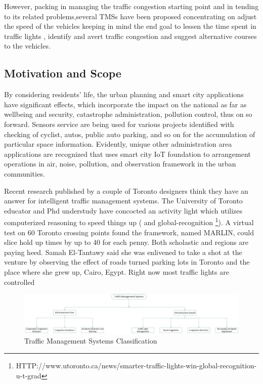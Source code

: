 \documentclass[conference]{IEEEtran}
\begin{document}
  However, packing in managing the traffic congestion starting point and in tending to its related problems,several TMSs have been proposed concentrating on adjust the speed of the vehicles keeping in mind the end goal to lessen the time spent in traffic lights , identify and avert traffic congestion and suggest alternative courses to the vehicles.
 \subsection{Motivation and Scope}
  By considering residents' life, the urban planning and smart city applications have significant effects, which incorporate the impact on the national as far as wellbeing and security, catastrophe administration, pollution control, thus on so forward. Sensors service are being used for various projects identified with checking of cyclist, autos, public auto parking, and so on for the accumulation of particular space information. Evidently, unique other administration area applications are recognized that uses smart city IoT foundation to arrangement operations in air, noise, pollution, and observation framework in the urban communities.

Recent research published by a couple of Toronto designers think they have an answer for intelligent traffic management systems. The University of Toronto educator and Phd understudy have concocted an activity light which utilizes computerized reasoning to speed things up (\cite{el-trantaway:multiagent} and global-recognition \footnote{HTTP://www.utoronto.ca/news/smarter-traffic-lights-win-global-recognition-u-t-grad}). A virtual test on 60 Toronto crossing points found the framework, named MARLIN, could slice hold up times by up to 40 for each penny. Both scholastic and regions are paying heed. Samah El-Tantawy said she was enlivened to take a shot at the venture by observing the effect of roads turned parking lots in Toronto and the place where she grew up, Cairo, Egypt. Right now most traffic lights are controlled 
\begin{figure}[!t]
\centering
\includegraphics[width=7in]{flowDiagramTrafficManagement}
\caption{Traffic Management Systems Classification}
\label{flow_diagm}
\end{figure}
\end{document}
